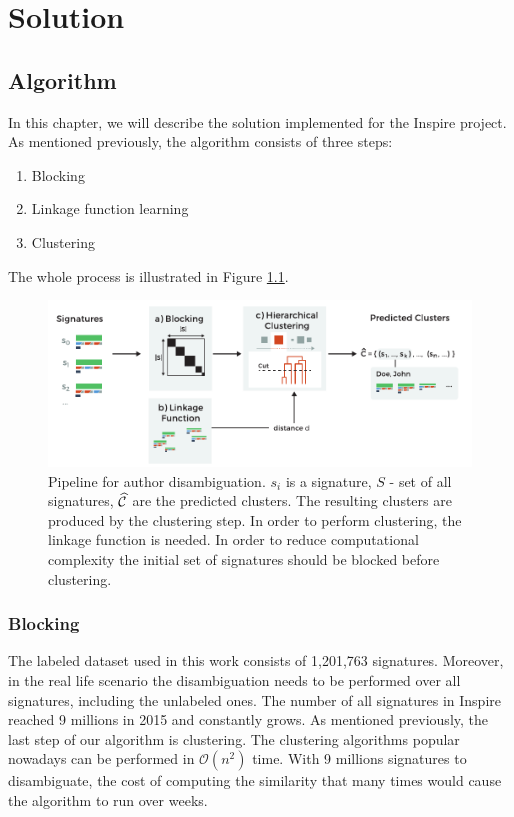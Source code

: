 \documentclass{pracamgr}
\begin{document}
\part{Solution}

\chapter{Algorithm}
In this chapter, we will describe the solution implemented for the Inspire project.
As mentioned previously, the algorithm consists of three steps:

\begin{enumerate}
    \item Blocking
    \item Linkage function learning
    \item Clustering
\end{enumerate}

The whole process is illustrated in Figure \ref{fig:workflow}. 

\begin{figure}[!ht]
\includegraphics[width=\textwidth]{figures/fig-workflow}
\caption{Pipeline for author disambiguation. $s_{i}$ is a signature, $S$ - set of 
all signatures, $\widehat{\cal C}$ are the predicted clusters. The resulting clusters
are produced by the clustering step. In order to perform clustering, the linkage
function is needed. In order to reduce computational complexity the initial set of
signatures should be blocked before clustering.}
\label{fig:workflow}
\end{figure} 

\section{Blocking}
The labeled dataset used in this work consists of 1,201,763 signatures. Moreover,
in the real life scenario the disambiguation needs to be performed over all signatures,
including the unlabeled ones. The number of all signatures in Inspire reached 9 millions
in 2015 and constantly grows. As mentioned previously, the last step of our
algorithm is clustering. The clustering algorithms popular nowadays can be performed
in $\mathcal{O}(n^2)$ time. With 9 millions signatures to disambiguate, the cost
of computing the similarity that many times would cause the algorithm to run over
weeks.
\end{document}
